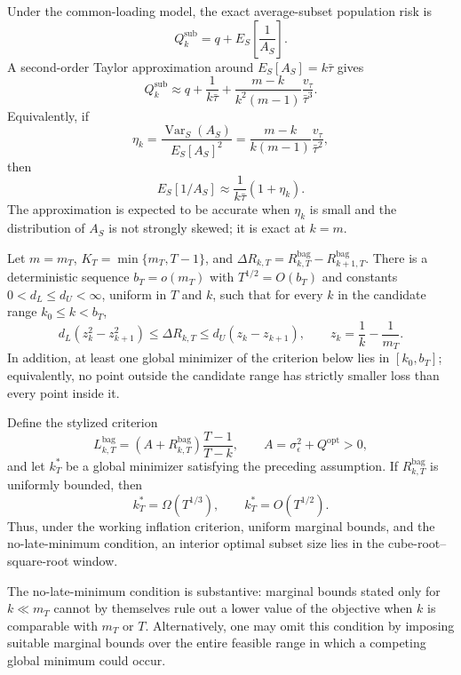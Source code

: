 \begin{proposition}
Under the common-loading model, the exact average-subset population risk is
\[
 Q_k^{\mathrm{sub}}=q+E_S\!\left[\frac{1}{A_S}\right].
\]
A second-order Taylor approximation around $E_S[A_S]=k\bar\tau$ gives
\[
 Q_k^{\mathrm{sub}}
 \approx q+\frac{1}{k\bar\tau}
 +\frac{m-k}{k^2(m-1)}\frac{v_\tau}{\bar\tau^3}.
\]
Equivalently, if
\[
 \eta_k=\frac{\operatorname{Var}_S(A_S)}{E_S[A_S]^2}
 =\frac{m-k}{k(m-1)}\frac{v_\tau}{\bar\tau^2},
\]
then
\[
 E_S[1/A_S]\approx\frac{1}{k\bar\tau}(1+\eta_k).
\]
The approximation is expected to be accurate when $\eta_k$ is small and the
distribution of $A_S$ is not strongly skewed; it is exact at $k=m$.
\end{proposition}

\begin{assumption}
Let $m=m_T$, $K_T=\min\{m_T,T-1\}$, and
$\Delta R_{k,T}=R_{k,T}^{\mathrm{bag}}-R_{k+1,T}^{\mathrm{bag}}$.
There is a deterministic sequence $b_T=o(m_T)$ with
$T^{1/2}=O(b_T)$ and constants $0<d_L\le d_U<\infty$, uniform in
$T$ and $k$, such that for every $k$ in the candidate range
$k_0\le k<b_T$,
\[
 d_L(z_k^2-z_{k+1}^2)
 \le \Delta R_{k,T}
 \le d_U(z_k-z_{k+1}),
 \qquad z_k=\frac1k-\frac1{m_T}.
\]
In addition, at least one global minimizer of the criterion below lies in
$[k_0,b_T]$; equivalently, no point outside the candidate range has strictly
smaller loss than every point inside it.
\end{assumption}

\begin{proposition}
Define the stylized criterion
\[
 L_{k,T}^{\mathrm{bag}}
 =\left(A+R_{k,T}^{\mathrm{bag}}\right)\frac{T-1}{T-k},
 \qquad A=\sigma_\epsilon^2+Q^{\mathrm{opt}}>0,
\]
and let $k_T^*$ be a global minimizer satisfying the preceding assumption.
If $R_{k,T}^{\mathrm{bag}}$ is uniformly bounded, then
\[
 k_T^*=\Omega(T^{1/3}),\qquad k_T^*=O(T^{1/2}).
\]
Thus, under the working inflation criterion, uniform marginal bounds, and
the no-late-minimum condition, an interior optimal subset size lies in the
cube-root--square-root window.
\end{proposition}

\noindent
The no-late-minimum condition is substantive: marginal bounds stated only
for $k\ll m_T$ cannot by themselves rule out a lower value of the objective
when $k$ is comparable with $m_T$ or $T$. Alternatively, one may omit this
condition by imposing suitable marginal bounds over the entire feasible
range in which a competing global minimum could occur.

